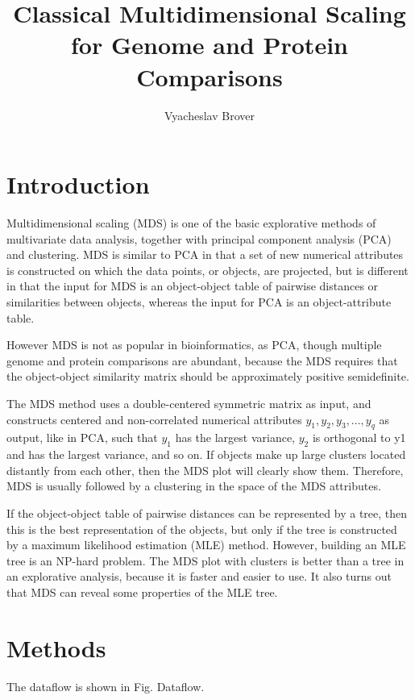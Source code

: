 \documentclass[10pt,a4paper]{article}
\title{Classical Multidimensional Scaling for Genome and Protein Comparisons}
\author{Vyacheslav Brover}
\begin{document}
\maketitle

\tableofcontents


\section{Introduction}

Multidimensional scaling (MDS) is one of the basic explorative methods of multivariate data analysis, together with principal component analysis (PCA) and clustering.
MDS is similar to PCA in that a set of new numerical attributes is constructed on which the data points, or objects, are projected,
but is different in that the input for MDS is an object-object table of pairwise distances or similarities between objects,
whereas the input for PCA is an object-attribute table.

However MDS is not as popular in bioinformatics, as PCA, though multiple genome and protein comparisons are abundant,
because the MDS requires that the object-object similarity matrix should be approximately positive semidefinite.

The MDS method uses a double-centered symmetric matrix as input, and constructs centered and non-correlated numerical attributes $y_1, y_2, y_3, \dots, y_q$ as output,
like in PCA, such that $y_1$ has the largest variance, $y_2$ is orthogonal to y1 and has the largest variance, and so on.
If objects make up large clusters located distantly from each other, then the MDS plot will clearly show them.
Therefore, MDS is usually followed by a clustering in the space of the MDS attributes.

If the object-object table of pairwise distances can be represented by a tree, then this is the best representation of the objects,
but only if the tree is constructed by a maximum likelihood estimation (MLE) method.
However, building an MLE tree is an NP-hard problem.
The MDS plot with clusters is better than a tree in an explorative analysis, because it is faster and easier to use.
It also turns out that MDS can reveal some properties of the MLE tree.




\section{Methods}

The dataflow is shown in Fig. {Dataflow}.
\end{document}

